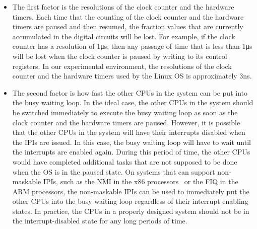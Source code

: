 \begin{itemize}
	\item The first factor is the resolutions of the clock counter and the hardware timers. Each time that the counting of the clock counter and the hardware timers are paused and then resumed, the fraction values that are currently accumulated in the digital circuits will be lost. For example, if the clock counter has a resolution of 1\si{\micro\second}, then any passage of time that is less than 1\si{\micro\second} will be lost when the clock counter is paused by writing to its control registers. In our experimental environment, the resolutions of the clock counter and the hardware timers used by the Linux OS is approximately 3\si{\nano\second}.
	
	\item The second factor is how fast the other CPUs in the system can be put into the busy waiting loop. In the ideal case, the other CPUs in the system should be switched immediately to execute the busy waiting loop as soon as the clock counter and the hardware timers are paused. However, it is possible that the other CPUs in the system will have their interrupts disabled when the IPIs are issued. In this case, the busy waiting loop will have to wait until the interrupts are enabled again. During this period of time, the other CPUs would have completed additional tasks that are not supposed to be done when the OS is in the paused state. On systems that can support non-maskable IPIs, such as the NMI in the x86 processors~\cite{Intel:2013} or the FIQ in the ARM processors, the non-maskable IPIs can be used to immediately put the other CPUs into the busy waiting loop regardless of their interrupt enabling states. In practice, the CPUs in a properly designed system should not be in the interrupt-disabled state for any long periods of time.
	

\end{itemize}

